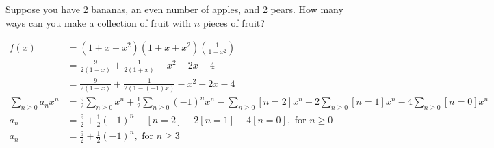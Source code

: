 Suppose you have 2 bananas, an even number of apples, and 2 pears. How many ways can you make a collection of fruit with $n$ pieces of fruit?
\begin{framed}
	\begin{align*}
		f(x) &= (1+x+x^2)(1+x+x^2)(\frac{1}{1-x^2})\\
			&= \frac{9}{2 (1-x)}+\frac{1}{2 (1+x)}-x^2-2x-4\\
			&= \frac{9}{2 (1-x)}+\frac{1}{2 (1-(-1)x)}-x^2-2x-4\\
		\sum_{n\ge0}a_nx^n &= \frac{9}{2}\sum_{n\ge0}x^n + \frac{1}{2}\sum_{n\ge0}(-1)^nx^n - \sum_{n\ge0}[n=2]x^n - 2\sum_{n\ge0}[n=1]x^n - 4\sum_{n\ge0}[n=0]x^n\\
		a_n &= \frac{9}{2} + \frac{1}{2}(-1)^n - [n=2] - 2[n=1] - 4[n=0], \text{ for } n\ge 0\\
		a_n &= \frac{9}{2} + \frac{1}{2}(-1)^n, \text{ for } n\ge 3
	\end{align*}
\end{framed}